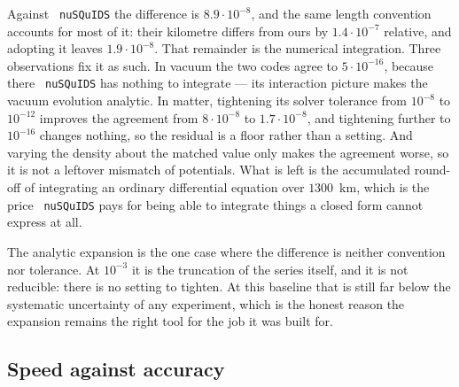 \documentclass[final,5p,times,twocolumn]{elsarticle}
\providecommand{\DIFaddtex}[1]{{\protect\color{blue} \sf #1}} %
\providecommand{\DIFadd}[1]{\DIFaddtex{#1}} %
\begin{document}
\DIFadd{Against }{\tt \DIFadd{nuSQuIDS}} \DIFadd{the difference is $8.9 \cdot 10^{-8}$, and the same length convention accounts for most of it: their kilometre differs from ours by $1.4 \cdot 10^{-7}$ relative, and adopting it leaves $1.9 \cdot 10^{-8}$.  That remainder is the numerical integration.  Three observations fix it as such.  In vacuum the two codes agree to $5 \cdot 10^{-16}$, because there }{\tt \DIFadd{nuSQuIDS}} \DIFadd{has nothing to integrate --- its interaction picture makes the vacuum evolution analytic.  In matter, tightening its solver tolerance from $10^{-8}$ to $10^{-12}$ improves the agreement from $8 \cdot 10^{-8}$ to $1.7 \cdot 10^{-8}$, and tightening further to $10^{-16}$ changes nothing, so the residual is a floor rather than a setting.  And varying the density about the matched value only makes the agreement worse, so it is not a leftover mismatch of potentials.  What is left is the accumulated round-off of integrating an ordinary differential equation over $1300$~km, which is the price }{\tt \DIFadd{nuSQuIDS}} \DIFadd{pays for being able to integrate things a closed form cannot express at all.
}

\DIFadd{The analytic expansion is the one case where the difference is neither convention nor tolerance.  At $10^{-3}$ it is the truncation of the series itself, and it is not reducible: there is no setting to tighten.  At this baseline that is still far below the systematic uncertainty of any experiment, which is the honest reason the expansion remains the right tool for the job it was built for.
}

\subsection{\DIFadd{Speed against accuracy}}
\label{section:plane}
\end{document}
